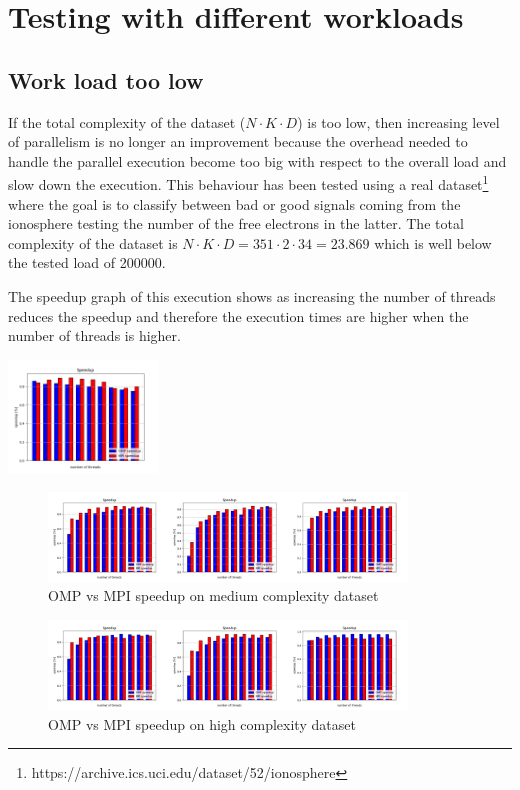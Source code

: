 \documentclass[conference]{IEEEtran}
\begin{document}
\section{Testing with different workloads\label{sec:diff_loads}}
\subsection{Work load too low}
If the total complexity of the dataset ($N\cdot K\cdot D$) is too low, then increasing level of parallelism is no longer an improvement because the overhead needed to handle the parallel execution become too big with respect to the overall load and slow down the execution. This behaviour has been tested using a real dataset\footnote{https://archive.ics.uci.edu/dataset/52/ionosphere} where the goal is to classify between bad or good signals coming from the ionosphere testing the number of the free electrons in the latter. The total complexity of the dataset is $N\cdot K\cdot D = 351 \cdot 2\cdot 34 = 23.869$ which is well below the tested load of 200000.

The speedup graph of this execution shows as increasing the number of threads reduces the speedup and therefore the execution times are higher when the number of threads is higher.
\centerline{\includegraphics[width = 0.3\textwidth]{imgs/suWine.png}}

\begin{figure}
  \centering
  \caption{OMP vs MPI speedup on medium complexity dataset}
  \label{fig:su_res}
  \includegraphics[width = 0.85\textwidth]{imgs/suplts.png}
\end{figure}
\begin{figure}
  \centering
  \caption{OMP vs MPI speedup on high complexity dataset}
  \label{fig:suslow}
  \includegraphics[width = 0.85\textwidth]{imgs/suhighcplt.png}
\end{figure}
\end{document}
